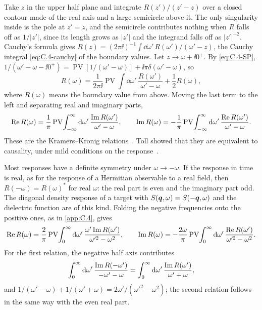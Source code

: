 Take $z$ in the upper half plane and integrate $R(z')/(z' - z)$ over a closed contour made of the real axis and a large semicircle above it. The only singularity inside is the pole at $z' = z$, and the semicircle contributes nothing when $R$ falls off as $1/|z'|$, since its length grows as $|z'|$ and the integrand falls off as $|z'|^{-2}$. Cauchy's formula gives $R(z) = (2\pi\ii)^{-1}\int\dd\omega'\,R(\omega')/(\omega' - z)$, the Cauchy integral \cref{eq:C.4-cauchy} of the boundary values. Let $z \to \omega + \ii0^+$. By \cref{eq:C.4-SP}, $1/(\omega' - \omega - \ii0^+) = \operatorname{PV}[1/(\omega' - \omega)] + \ii\pi\delta(\omega' - \omega)$, so
\begin{equation*}
  R(\omega) = \frac{1}{2\pi\ii}\operatorname{PV}\!\int\dd\omega'\,\frac{R(\omega')}{\omega' - \omega} + \frac12R(\omega) ,
\end{equation*}
where $R(\omega)$ means the boundary value from above. Moving the last term to the left and separating real and imaginary parts,
\begin{equation}
  \operatorname{Re} R(\omega) = \frac{1}{\pi}\operatorname{PV}\!\int_{-\infty}^{\infty}\mathrm{d}\omega'\,\frac{\operatorname{Im} R(\omega')}{\omega' - \omega}, \qquad
  \operatorname{Im} R(\omega) = -\frac{1}{\pi}\operatorname{PV}\!\int_{-\infty}^{\infty}\mathrm{d}\omega'\,\frac{\operatorname{Re} R(\omega')}{\omega' - \omega} .
  \label{eq:C.5-KK}
\end{equation}
These are the Kramers--Kronig relations~\cite{kronig1926theory,kramers1927diffusion}. Toll showed that they are equivalent to causality, under mild conditions on the response~\cite{toll1956causality}.

Most responses have a definite symmetry under $\omega \to -\omega$. If the response in time is real, as for the response of a Hermitian observable to a real field, then $R(-\omega) = R(\omega)^*$ for real $\omega$: the real part is even and the imaginary part odd. The diagonal density response of a target with $S(\bm{q},\omega) = S(-\bm{q},\omega)$ and the dielectric function are of this kind. Folding the negative frequencies onto the positive ones, as in \cref{app:C.4}, gives
\begin{equation}
  \operatorname{Re} R(\omega) = \frac{2}{\pi}\operatorname{PV}\!\int_0^\infty\mathrm{d}\omega'\,\frac{\omega'\operatorname{Im} R(\omega')}{\omega'^2 - \omega^2}, \qquad
  \operatorname{Im} R(\omega) = -\frac{2\omega}{\pi}\operatorname{PV}\!\int_0^\infty\mathrm{d}\omega'\,\frac{\operatorname{Re} R(\omega')}{\omega'^2 - \omega^2} .
  \label{eq:C.5-KKhalf}
\end{equation}
For the first relation, the negative half axis contributes
\begin{equation*}
  \int_0^\infty\mathrm{d}\omega'\,\frac{\operatorname{Im} R(-\omega')}{-\omega' - \omega} = \int_0^\infty\mathrm{d}\omega'\,\frac{\operatorname{Im} R(\omega')}{\omega' + \omega} ,
\end{equation*}
and $1/(\omega' - \omega) + 1/(\omega' + \omega) = 2\omega'/(\omega'^2 - \omega^2)$; the second relation follows in the same way with the even real part.

